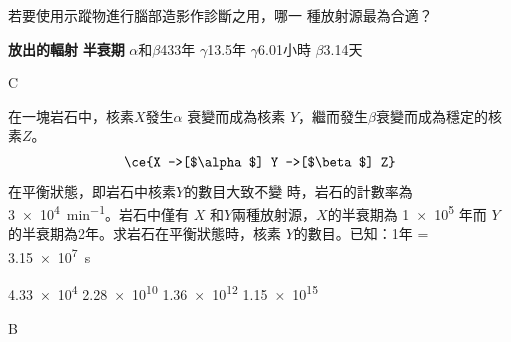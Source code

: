 {
    若要使用示蹤物進行腦部造影作診斷之用，哪一 種放射源最為合適？
    \begin{tasks}
        \task [] \textbf{放出的輻射} \tab \textbf{半衰期}
        \task $\alpha$和$\beta$\tab 433年
        \task $\gamma$\tab 13.5年
        \task $\gamma$\tab 6.01小時
        \task $\beta$\tab 3.14天
    \end{tasks}

}{C}

{
    在一塊岩石中，核素$X$發生$\alpha$ 衰變而成為核素 $Y$，繼而發生$\beta$衰變而成為穩定的核素$Z$。
    \begin{align*}
        \ce{X ->[$\alpha$] Y ->[$\beta$] Z}
    \end{align*}
    在平衡狀態，即岩石中核素$Y$的數目大致不變 時，岩石的計數率為  \qty{3e4}{min^{-1}}。岩石中僅有 $X$ 和$Y$兩種放射源，$X$的半衰期為  \qty{1e5}{} 年而 $Y$的半衰期為2年。求岩石在平衡狀態時，核素 $Y$的數目。已知：1年 =  \qty{3.15e7}{s}
    \begin{tasks}
        \task \num{4.33e4}
        \task \num{2.28e10}
        \task \num{1.36e12}
        \task \num{1.15e15}
    \end{tasks}
}{B}

